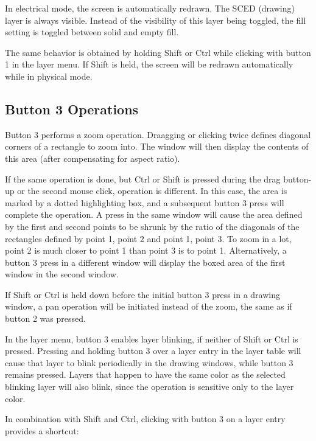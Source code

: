 In electrical mode, the screen is automatically redrawn.  The SCED
(drawing) layer is always visible.  Instead of the visibility of this
layer being toggled, the fill setting is toggled between solid and
empty fill.

The same behavior is obtained by holding {\kb Shift} or {\kb Ctrl}
while clicking with button 1 in the layer menu.  If {\kb Shift} is
held, the screen will be redrawn automatically while in physical
mode.

\subsection{Button 3 Operations}
Button 3 performs a zoom operation.  Draagging or clicking twice
defines diagonal corners of a rectangle to zoom into.  The window will
then display the contents of this area (after compensating for aspect
ratio).

If the same operation is done, but {\kb Ctrl} or {\kb Shift} is
pressed during the drag button-up or the second mouse click, operation
is different.  In this case, the area is marked by a dotted
highlighting box, and a subsequent button 3 press will complete the
operation.  A press in the same window will cause the area defined by
the first and second points to be shrunk by the ratio of the diagonals
of the rectangles defined by point 1, point 2 and point 1, point 3. 
To zoom in a lot, point 2 is much closer to point 1 than point 3 is to
point 1.  Alternatively, a button 3 press in a different window will
display the boxed area of the first window in the second window.

If {\kb Shift} or {\kb Ctrl} is held down before the initial button 3
press in a drawing window, a pan operation will be initiated instead
of the zoom, the same as if button 2 was pressed.

In the layer menu, button 3 enables layer blinking, if neither of {\kb
Shift} or {\cb Ctrl} is pressed.  Pressing and holding button 3 over a
layer entry in the layer table will cause that layer to blink
periodically in the drawing windows, while button 3 remains pressed. 
Layers that happen to have the same color as the selected blinking
layer will also blink, since the operation is sensitive only to the
layer color.

In combination with {\kb Shift} and {\kb Ctrl}, clicking with button 3
on a layer entry provides a shortcut:

